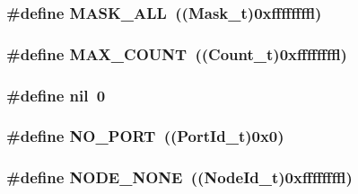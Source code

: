 \hypertarget{common-defs_8hpp_1d4b2f1f2500bf78dd35c3be18693241}{
\subsubsection[{MASK\_\-ALL}]{\setlength{\rightskip}{0pt plus 5cm}\#define MASK\_\-ALL~(({\bf Mask\_\-t})0xffffffffl)}}
\label{common-defs_8hpp_1d4b2f1f2500bf78dd35c3be18693241}


\hypertarget{common-defs_8hpp_e14eaaed1fe7cdf491da54a714c426b3}{
\subsubsection[{MAX\_\-COUNT}]{\setlength{\rightskip}{0pt plus 5cm}\#define MAX\_\-COUNT~(({\bf Count\_\-t})0xffffffffl)}}
\label{common-defs_8hpp_e14eaaed1fe7cdf491da54a714c426b3}


\hypertarget{common-defs_8hpp_7a7ca81d2a85873283b5ec82953b1b25}{
\subsubsection[{nil}]{\setlength{\rightskip}{0pt plus 5cm}\#define nil~0}}
\label{common-defs_8hpp_7a7ca81d2a85873283b5ec82953b1b25}


\hypertarget{common-defs_8hpp_97d79bc575f6aa07f65b65c3d64dbd9a}{
\subsubsection[{NO\_\-PORT}]{\setlength{\rightskip}{0pt plus 5cm}\#define NO\_\-PORT~(({\bf PortId\_\-t})0x0)}}
\label{common-defs_8hpp_97d79bc575f6aa07f65b65c3d64dbd9a}


\hypertarget{common-defs_8hpp_1b42e58f4612fce6b5ffe2617f35173f}{
\subsubsection[{NODE\_\-NONE}]{\setlength{\rightskip}{0pt plus 5cm}\#define NODE\_\-NONE~(({\bf NodeId\_\-t})0xffffffffl)}}
\label{common-defs_8hpp_1b42e58f4612fce6b5ffe2617f35173f}



